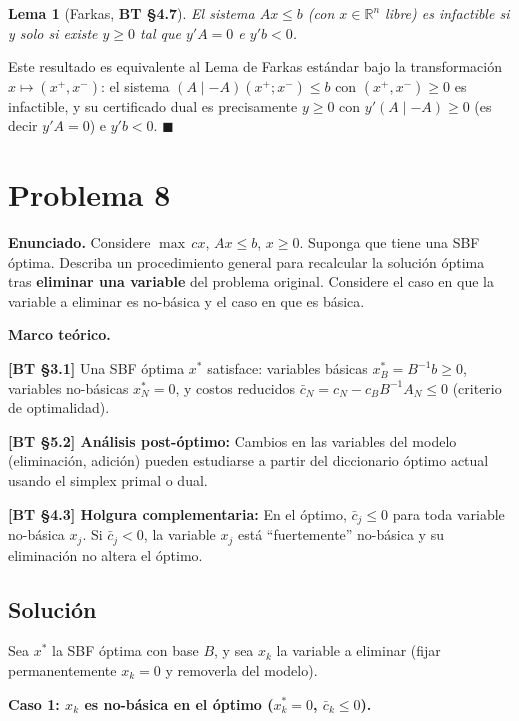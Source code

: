 \documentclass{article}
\newtheorem*{lema}{Lema}
\newenvironment{marco}{\begin{mdframed}[linecolor=black!40,backgroundcolor=gray!5]\small\textbf{Marco teórico.}\par\smallskip}{\end{mdframed}\medskip}
\begin{document}
\begin{lema}[Farkas, \textbf{BT §4.7}]
El sistema $Ax \leq b$ (con $x \in \mathbb{R}^n$ libre) es infactible si y solo si existe $y \geq 0$ tal que $y'A = 0$ e $y'b < 0$.
\end{lema}

Este resultado es equivalente al Lema de Farkas estándar bajo la transformación $x \mapsto (x^+, x^-)$: el sistema $(A \mid -A)(x^+; x^-) \leq b$ con $(x^+, x^-) \geq 0$ es infactible, y su certificado dual es precisamente $y \geq 0$ con $y'(A \mid -A) \geq 0$ (es decir $y'A = 0$) e $y'b < 0$. $\blacksquare$

\section*{Problema 8}

\textbf{Enunciado.} Considere $\max\, cx$, $Ax \leq b$, $x \geq 0$. Suponga que tiene una SBF óptima. Describa un procedimiento general para recalcular la solución óptima tras \textbf{eliminar una variable} del problema original. Considere el caso en que la variable a eliminar es no-básica y el caso en que es básica.

\begin{marco}
\textbf{[BT §3.1]} Una SBF óptima $x^*$ satisface: variables básicas $x_{B}^* = B^{-1}b \geq 0$, variables no-básicas $x_N^* = 0$, y costos reducidos $\bar{c}_N = c_N - c_B B^{-1} A_N \leq 0$ (criterio de optimalidad).

\textbf{[BT §5.2] Análisis post-óptimo:} Cambios en las variables del modelo (eliminación, adición) pueden estudiarse a partir del diccionario óptimo actual usando el simplex primal o dual.

\textbf{[BT §4.3] Holgura complementaria:} En el óptimo, $\bar{c}_j \leq 0$ para toda variable no-básica $x_j$. Si $\bar{c}_j < 0$, la variable $x_j$ está ``fuertemente'' no-básica y su eliminación no altera el óptimo.
\end{marco}

\subsection*{Solución}

Sea $x^*$ la SBF óptima con base $B$, y sea $x_k$ la variable a eliminar (fijar permanentemente $x_k = 0$ y removerla del modelo).

\medskip
\textbf{Caso 1: $x_k$ es no-básica en el óptimo ($x_k^* = 0$, $\bar{c}_k \leq 0$).}
\end{document}
